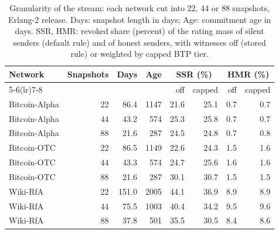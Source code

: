 \begin{table}[!t]
\centering
\scriptsize
\setlength{\tabcolsep}{3pt}
\caption{Granularity of the stream: each network cut into 22, 44 or 88 snapshots, Erlang-2 release. Days: snapshot length in days; Age: commitment age in days. SSR, HMR: revoked share (percent) of the rating mass of silent senders (default rule) and of honest senders, with witnesses off (stored rule) or weighted by capped BTP tier.}
\label{tab:s_s_granularity}
\begin{tabular}{@{}lrrrrrrr@{}}
\toprule
\textbf{Network} & \textbf{Snapshots} & \textbf{Days} & \textbf{Age} & \multicolumn{2}{c}{\textbf{SSR (\%)}} & \multicolumn{2}{c}{\textbf{HMR (\%)}} \\
\cmidrule(lr){5-6}\cmidrule(lr){7-8}
 & & & & off & capped & off & capped \\
\midrule
Bitcoin-Alpha & 22 & 86.4 & 1147 & 21.6 & 25.1 & 0.7 & 0.7 \\
Bitcoin-Alpha & 44 & 43.2 & 574 & 25.3 & 25.8 & 0.7 & 0.7 \\
Bitcoin-Alpha & 88 & 21.6 & 287 & 24.5 & 24.8 & 0.7 & 0.8 \\
Bitcoin-OTC & 22 & 86.5 & 1149 & 22.6 & 24.3 & 1.5 & 1.6 \\
Bitcoin-OTC & 44 & 43.3 & 574 & 24.7 & 25.6 & 1.6 & 1.6 \\
Bitcoin-OTC & 88 & 21.6 & 287 & 30.1 & 30.7 & 1.5 & 1.5 \\
Wiki-RfA & 22 & 151.0 & 2005 & 44.1 & 36.9 & 8.9 & 8.9 \\
Wiki-RfA & 44 & 75.5 & 1003 & 40.4 & 34.2 & 9.5 & 9.6 \\
Wiki-RfA & 88 & 37.8 & 501 & 35.5 & 30.5 & 8.4 & 8.6 \\
\bottomrule
\end{tabular}
\end{table}
